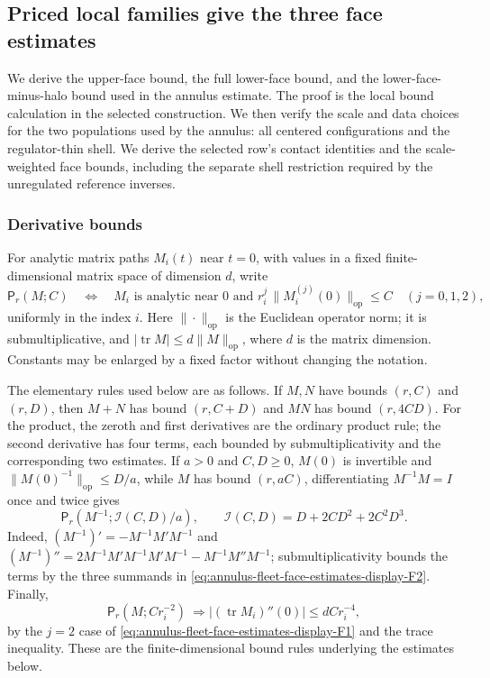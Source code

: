 \subsection{Priced local families give the three face estimates}
\label{sec:ex-annulus-fleet-faces}

We derive the upper-face bound, the full lower-face bound, and the
lower-face-minus-halo bound used in the annulus estimate. The proof is the
local bound calculation in the selected construction. We then verify the
scale and data choices for the two populations used by the annulus: all
centered configurations and the regulator-thin shell. We derive the
selected row's contact identities and the scale-weighted face bounds,
including the separate shell restriction required by the unregulated
reference inverses.

\subsubsection{Derivative bounds}

For analytic matrix paths $M_i(t)$ near $t=0$, with values in a fixed
finite-dimensional matrix space of dimension $d$, write
\begin{equation}
 \mathsf P_{r}(M;C)\quad\Longleftrightarrow\quad
 M_i\text{ is analytic near }0\text{ and }
 r_i^j\,\|M_i^{(j)}(0)\|_{\mathrm{op}}\leq C
 \quad(j=0,1,2),
 \label{eq:annulus-fleet-face-estimates-display-F1}
\end{equation}
uniformly in the index $i$. Here $\|\cdot\|_{\mathrm{op}}$ is the
Euclidean operator norm; it is submultiplicative, and
$|\operatorname{tr}M|\leq d\|M\|_{\mathrm{op}}$, where $d$ is the matrix
dimension. Constants may be enlarged by a fixed factor without changing
the notation.

The elementary rules used below are as follows. If $M,N$ have bounds
$(r,C)$ and $(r,D)$, then $M+N$ has bound $(r,C+D)$ and $MN$ has bound
$(r,4CD)$. For the product, the zeroth and first derivatives are the
ordinary product rule; the second derivative has four terms, each bounded
by submultiplicativity and the corresponding two estimates. If $a>0$
and $C,D\geq0$, $M(0)$ is invertible and
$\|M(0)^{-1}\|_{\mathrm{op}}\leq D/a$, while $M$ has bound $(r,aC)$,
differentiating $M^{-1}M=I$ once and twice gives
\begin{equation}
 \mathsf P_r(M^{-1};\mathcal I(C,D)/a),\qquad
 \mathcal I(C,D)=D+2CD^2+2C^2D^3.
 \label{eq:annulus-fleet-face-estimates-display-F2}
\end{equation}
Indeed, $(M^{-1})'=-M^{-1}M'M^{-1}$ and
$(M^{-1})''=2M^{-1}M'M^{-1}M'M^{-1}-M^{-1}M''M^{-1}$;
submultiplicativity bounds the terms by the three summands in \eqref{eq:annulus-fleet-face-estimates-display-F2}.
Finally,
\begin{equation}
 \mathsf P_r(M;C r_i^{-2})
 \ \Longrightarrow
 |(\operatorname{tr}M_i)''(0)|\leq dC r_i^{-4},
 \label{eq:annulus-fleet-face-estimates-display-F3}
\end{equation}
by the $j=2$ case of \eqref{eq:annulus-fleet-face-estimates-display-F1} and the trace inequality. These are the
finite-dimensional bound rules underlying the estimates below.


